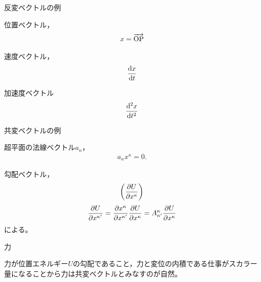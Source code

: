 \documentclass[uplatex]{jsarticle}
\begin{document}
\sukima {}\par
\noindent\textbullet\; 反変ベクトルの例\par
\qquad  
\begin{minipage}[t]{0.15\columnwidth}
  位置ベクトル，
  \begin{align*}
    x = \overrightarrow{\mathrm{OP}}
  \end{align*}
\end{minipage}
\vspace{0.05\baselineskip}
\begin{minipage}[t]{0.15\columnwidth}
  速度ベクトル，
  \begin{align*}
    \dfrac{\mathrm{d}x}{\mathrm{d}t}
  \end{align*}
\end{minipage}
\vspace{0.05\baselineskip}
\begin{minipage}[t]{0.15\columnwidth}
  加速度ベクトル
  \begin{align*}
    \dfrac{\mathrm{d}^{2}x}{\mathrm{d}t^{2}}
  \end{align*} 
\end{minipage}

\sukima\noindent\textbullet\; 共変ベクトルの例\par
\qquad  
\begin{minipage}[t]{0.3\columnwidth}
  超平面の法線ベクトル$a_{\kappa}$，
  \begin{align*}
    a_{\kappa} x^{\kappa} = 0.
  \end{align*}
\end{minipage}
\vspace{0.05\baselineskip}
\begin{minipage}[t]{0.3\columnwidth}
  勾配ベクトル，
  \begin{align*}
    \left( \dfrac{\partial U}{\partial x^{\kappa}} \right)
  \end{align*}
  {\footnotesize
  \begin{align*}
    \dfrac{\partial U}{\partial x^{\kappa^{\prime}}} = \dfrac{\partial x^{\kappa}}{\partial x^{\kappa^{\prime}}} \dfrac{\partial U}{\partial x^{\kappa}} = A_{\kappa^{\prime}}^{\kappa} \dfrac{\partial U}{\partial x^{\kappa}}
  \end{align*}
  による。
  }
\end{minipage}
\vspace{0.05\baselineskip}
\begin{minipage}[t]{0.3\columnwidth}
  力\par
  {\footnotesize
  力が位置エネルギー$U$の勾配であること，力と変位の内積である仕事がスカラー量になることから力は共変ベクトルとみなすのが自然。
  }
\end{minipage}
\end{document}
